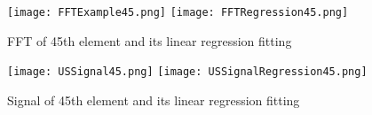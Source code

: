 \documentclass[11pt,letterpaper]{article}
\begin{document}
\begin{figure}[!htbp]
	\texttt{[image: FFTExample45.png]}
	\texttt{[image: FFTRegression45.png]}
	\caption{FFT of 45th element and its linear regression fitting}
	\label{fig:10}       %
\end{figure}
% 
\begin{figure}[!htbp]
	\texttt{[image: USSignal45.png]}
	\texttt{[image: USSignalRegression45.png]}
	\caption{Signal of 45th element and its linear regression fitting }
	\label{fig:11}       %
\end{figure}
% 
\end{document}
